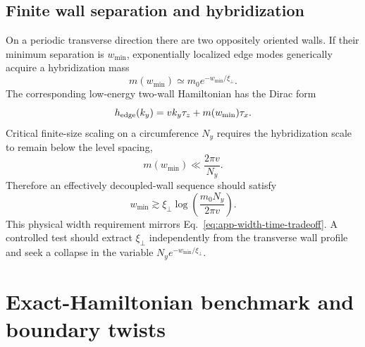 \subsection{Finite wall separation and hybridization}

On a periodic transverse direction there are two oppositely oriented walls.
If their minimum separation is \(w_{\min}\), exponentially localized edge
modes generically acquire a hybridization mass
\begin{equation}
    m(w_{\min})\simeq m_0e^{-w_{\min}/\xi_\perp}.
    \label{eq:app-wall-hybridization-mass}
\end{equation}
The corresponding low-energy two-wall Hamiltonian has the Dirac form
\begin{equation}
    h_{\rm edge}(k_y)=v k_y\tau_z+m(w_{\min})\tau_x.
    \label{eq:app-two-wall-Dirac}
\end{equation}
Critical finite-size scaling on a circumference \(N_y\) requires the
hybridization scale to remain below the level spacing,
\begin{equation}
    m(w_{\min})\ll\frac{2\pi v}{N_y}.
\end{equation}
Therefore an effectively decoupled-wall sequence should satisfy
\begin{equation}
    \boxed{
    w_{\min}\gtrsim\xi_\perp
    \log\!\left(\frac{m_0N_y}{2\pi v}\right).}
    \label{eq:app-wall-width-condition}
\end{equation}
This physical width requirement mirrors
Eq.~\eqref{eq:app-width-time-tradeoff}.  A controlled test should extract
\(\xi_\perp\) independently from the transverse wall profile and seek a
collapse in the variable \(N_ye^{-w_{\min}/\xi_\perp}\).



\section{Exact-Hamiltonian benchmark and boundary twists}
\label{app:exact-H-benchmark}

